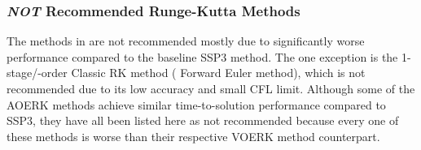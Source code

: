 \subsubsection{\emph{NOT} Recommended Runge-Kutta Methods}
\label{SEC:Time:Methods:Bad}

The methods in  are not recommended mostly due to
significantly worse performance compared to the baseline SSP3 method.
%
The one exception is the 1-stage/-order Classic RK method (\thatis
Forward Euler method), which is not recommended due to its low accuracy and
small CFL limit.
%
Although some of the AOERK methods achieve similar time-to-solution performance
compared to SSP3, they have all been listed here as not recommended because
every one of these methods is worse than their respective VOERK method
counterpart.


